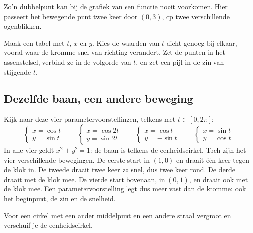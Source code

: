 Zo'n dubbelpunt kan bij de grafiek van een functie nooit voorkomen. Hier passeert het bewegende punt twee keer door $(0, 3)$, op twee verschillende ogenblikken.

\begin{werkwijze}
Maak een tabel met $t$, $x$ en $y$. Kies de waarden van $t$ dicht genoeg bij elkaar, vooral waar de kromme snel van richting verandert. Zet de punten in het assenstelsel, verbind ze in de volgorde van $t$, en zet een pijl in de zin van stijgende $t$.
\end{werkwijze}


\begin{oefeningen}
\end{oefeningen}

\subsection{Dezelfde baan, een andere beweging}

Kijk naar deze vier parametervoorstellingen, telkens met $t \in [0, 2\pi]$:
\[ \begin{cases} x = \cos t \\ y = \sin t \end{cases} \qquad \begin{cases} x = \cos 2t \\ y = \sin 2t \end{cases} \qquad \begin{cases} x = \cos t \\ y = -\sin t \end{cases} \qquad \begin{cases} x = \sin t \\ y = \cos t \end{cases} \]
In alle vier geldt $x^2 + y^2 = 1$: de baan is telkens de eenheidscirkel. Toch zijn het vier verschillende bewegingen. De eerste start in $(1, 0)$ en draait één keer tegen de klok in. De tweede draait twee keer zo snel, dus twee keer rond. De derde draait met de klok mee. De vierde start bovenaan, in $(0, 1)$, en draait ook met de klok mee. Een parametervoorstelling legt dus meer vast dan de kromme: ook het beginpunt, de zin en de snelheid.

Voor een cirkel met een ander middelpunt en een andere straal vergroot en verschuif je de eenheidscirkel.

